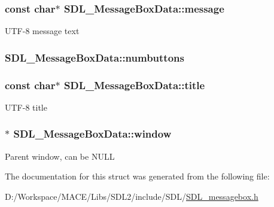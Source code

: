 \subsubsection[{\texorpdfstring{message}{message}}]{\setlength{\rightskip}{0pt plus 5cm}const char$\ast$ S\+D\+L\+\_\+\+Message\+Box\+Data\+::message}\hypertarget{struct_s_d_l___message_box_data_ada6ae208a1f85adabbd7a7a08ca609c8}{}\label{struct_s_d_l___message_box_data_ada6ae208a1f85adabbd7a7a08ca609c8}
U\+T\+F-\/8 message text 
\subsubsection[{\texorpdfstring{numbuttons}{numbuttons}}]{ S\+D\+L\+\_\+\+Message\+Box\+Data\+::numbuttons}\hypertarget{struct_s_d_l___message_box_data_a133f4fef549cc0cb14b799af35f3dc5a}{}\label{struct_s_d_l___message_box_data_a133f4fef549cc0cb14b799af35f3dc5a}
\subsubsection[{\texorpdfstring{title}{title}}]{\setlength{\rightskip}{0pt plus 5cm}const char$\ast$ S\+D\+L\+\_\+\+Message\+Box\+Data\+::title}\hypertarget{struct_s_d_l___message_box_data_a93ceeafeed20b553ad4c86c9be37f117}{}\label{struct_s_d_l___message_box_data_a93ceeafeed20b553ad4c86c9be37f117}
U\+T\+F-\/8 title 
\subsubsection[{\texorpdfstring{window}{window}}]{$\ast$ S\+D\+L\+\_\+\+Message\+Box\+Data\+::window}\hypertarget{struct_s_d_l___message_box_data_a5c333bc93705c66068e140bc28daedcb}{}\label{struct_s_d_l___message_box_data_a5c333bc93705c66068e140bc28daedcb}
Parent window, can be N\+U\+LL 

The documentation for this struct was generated from the following file\+:\begin{DoxyCompactItemize}
\item 
D\+:/\+Workspace/\+M\+A\+C\+E/\+Libs/\+S\+D\+L2/include/\+S\+D\+L/\hyperlink{_s_d_l__messagebox_8h}{S\+D\+L\+\_\+messagebox.\+h}\end{DoxyCompactItemize}
